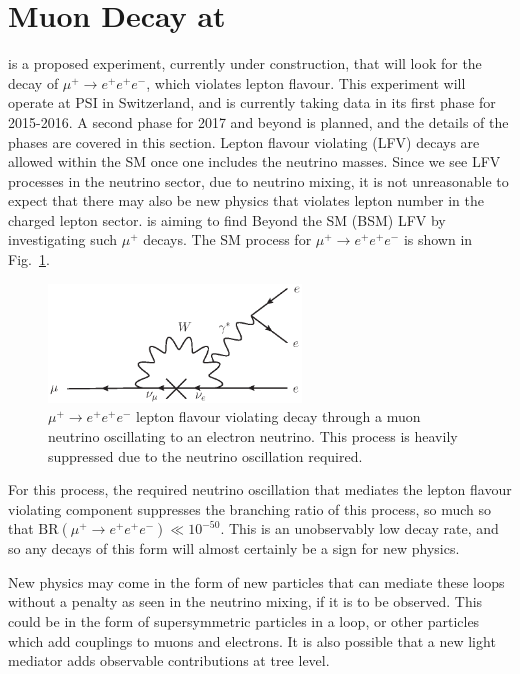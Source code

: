 \section{Muon Decay at \mueee}
\label{sec:mu3e_experiment}
\mueee \cite{Blondel:2013ia} is a proposed experiment, currently under construction, that will look for the decay of $\mu^+ \rightarrow e^+ e^+ e^-$, which violates lepton flavour.
This experiment will operate at PSI in Switzerland, and is currently taking data in its first phase for 2015-2016.
A second phase for 2017 and beyond is planned, and the details of the phases are covered in this section. 
Lepton flavour violating (LFV) decays are allowed within the SM once one includes the neutrino masses.
Since we see LFV processes in the neutrino sector, due to neutrino mixing, it is not unreasonable to expect that there may also be new physics that violates lepton number in the charged lepton sector.
\mueee is aiming to find Beyond the SM (BSM) LFV by investigating such $\mu^+$ decays.
The SM process for $\mu^+ \rightarrow e^+ e^+ e^-$ is shown in Fig.~\ref{fig:mu_eee_SM}.
\begin{figure}[h]
    \centering
    \includegraphics[width = 0.6\textwidth]{Figures/feynman_diagrams/mu_eee_SM.eps}
    \caption[$\mu^+ \rightarrow e^+ e^+ e^-$ lepton flavour violating decay through a muon neutrino oscillating to an electron neutrino.]{$\mu^+ \rightarrow e^+ e^+ e^-$ lepton flavour violating decay through a muon neutrino oscillating to an electron neutrino. This process is heavily suppressed due to the neutrino oscillation required.}
    \label{fig:mu_eee_SM}
\end{figure}
For this process, the required neutrino oscillation that mediates the lepton flavour violating component suppresses the branching ratio of this process, so much so that $\textrm{BR}(\mu^+ \rightarrow e^+ e^+ e^-) \ll 10^{-50}$.
This is an unobservably low decay rate, and so any decays of this form will almost certainly be a sign for new physics.

New physics may come in the form of new particles that can mediate these loops without a penalty as seen in the neutrino mixing, if it is to be observed.
This could be in the form of supersymmetric particles in a loop, or other particles which add couplings to muons and electrons.
It is also possible that a new light mediator adds observable contributions at tree level.

